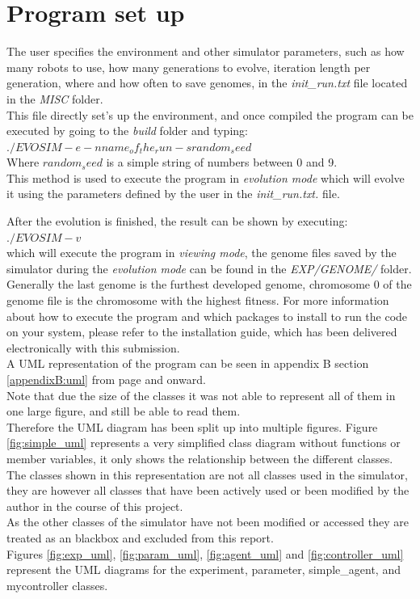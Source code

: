 \section{Program set up}
The user specifies the  environment and other simulator parameters, such as how many robots to use, how many generations to evolve, iteration length per generation, where and how often to save genomes, in the \textit{init\_run.txt} file located in the \textit{MISC} folder. \\
This file directly set's up the environment, and once compiled the program can be executed by going to the \textit{build} folder and typing:\\

$./EVOSIM -e -n name_of_the_run -s random_seed$ \\

Where $random_seed$ is a simple string of numbers between 0 and 9. \\
This method is used to execute the program in \textit{evolution mode} which will evolve it using the parameters defined by the user in the \textit{init\_run.txt.} file.

After the evolution is finished, the result can be shown by executing:\\

$./EVOSIM -v$\\

which will execute the program in \textit{viewing mode}, the genome files saved by the simulator during the \textit{evolution mode} can be found in the \textit{EXP/GENOME/} folder. Generally the last genome is the furthest developed genome, chromosome 0 of the genome file is the chromosome with the highest fitness. For more information about how to execute the program and which packages to install to run the code on your system, please refer to the installation guide, which has been delivered electronically with this submission.\\

A UML representation of the program can be seen in appendix B section \ref{appendixB:uml} from page \pageref{appendixB:uml} and onward. \\
Note that due the size of the classes it was not able to represent all of them in one large figure, and still be able to read them.\\
Therefore the UML diagram has been split up into multiple figures. 
Figure \ref{fig:simple_uml} represents a very simplified class diagram without functions or member variables, it only shows the relationship between the different classes.\\
The classes shown in this representation are not all classes used in the simulator, they are however all classes that have been actively used or been modified by the author in the course of this project.\\
As the other classes of the simulator have not been modified or accessed they are treated as an blackbox and excluded from this report.\\
Figures \ref{fig:exp_uml}, \ref{fig:param_uml}, \ref{fig:agent_uml} and \ref{fig:controller_uml} represent the UML diagrams for the experiment, parameter, simple\_agent, and mycontroller classes.\\


